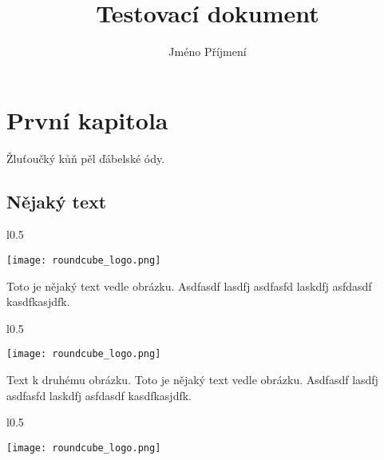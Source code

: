\documentclass[12pt,a4paper,twoside]{book}
\begin{document}
\setlength{\parindent}{0pt}

\title{Testovací dokument}
\author{Jméno Příjmení}
\maketitle

\setcounter{tocdepth}{1}
\tableofcontents
{}

\chapter{První kapitola}
Žluťoučký kůň pěl ďábelské ódy.
\section{Nějaký text}

\begin{wrapfigure}{l}{0.5\textwidth}
  \vspace{-30pt}
  \begin{center}
    \texttt{[image: roundcube\_logo.png]}
  \end{center}
  \vspace{-10pt}
\end{wrapfigure}

Toto je nějaký text vedle obrázku. Asdfasdf lasdfj asdfasfd laskdfj asfdasdf kasdfkasjdfk.
\newline

\begin{wrapfigure}{l}{0.5\textwidth}
  \vspace{-20pt}
  \begin{center}
    \texttt{[image: roundcube\_logo.png]}
  \end{center}
  \vspace{-20pt}
\end{wrapfigure}

Text k druhému obrázku. Toto je nějaký text vedle obrázku. Asdfasdf lasdfj asdfasfd laskdfj asfdasdf kasdfkasjdfk.
\newline

\begin{wrapfigure}{l}{0.5\textwidth}
  \vspace{-20pt}
  \begin{center}
    \texttt{[image: roundcube\_logo.png]}
  \end{center}
  \vspace{-20pt}
\end{wrapfigure}
\end{document}
